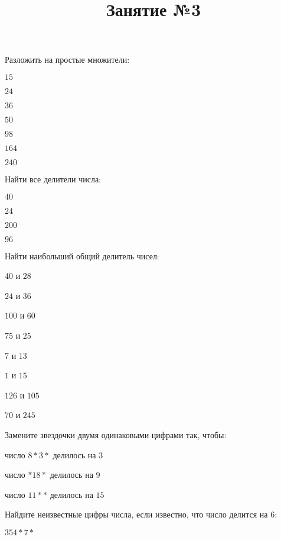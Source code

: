\title{Занятие №3}
\begin{listofex}
	\item Разложить на простые множители:
	\begin{enumcols}[itemcolumns=7]
		\item \( 15 \)
		\item \( 24 \)
		\item \( 36 \)
		\item \( 50 \)
		\item \( 98 \)
		\item \( 164 \)
		\item \( 240 \)
	\end{enumcols}
	\item Найти все делители числа:
	\begin{enumcols}[itemcolumns=4]
		\item \( 40 \)
		\item \( 24 \)
		\item \( 200 \)
		\item \( 96 \)
	\end{enumcols}
	\item Найти наибольший общий делитель чисел:
	\begin{enumcols}[itemcolumns=4]
		\item \( 40 \) и \( 28 \)
		\item \( 24 \) и \( 36 \)
		\item \( 100 \) и \( 60 \)
		\item \( 75 \) и \( 25 \)
		\item \( 7 \) и \( 13 \)
		\item \( 1 \) и \( 15 \)
		\item \( 126 \) и \( 105 \)
		\item \( 70 \) и \( 245 \)
	\end{enumcols}
	\item Замените звездочки двумя одинаковыми цифрами так, чтобы:
	\begin{enumcols}[itemcolumns=1]
		\item число \( 8*3* \) делилось на \( 3 \)
		\item число \( *18* \) делилось на \( 9 \)
		\item число \( 11** \) делилось на \( 15 \)
	\end{enumcols}
	\item Найдите неизвестные цифры числа, если известно, что число делится на \( 6 \):
	\begin{enumcols}[itemcolumns=2]
		\item \( 354*7* \)

\end{enumcols}
\end{listofex}
